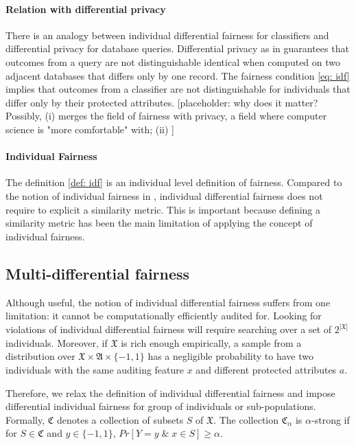 \documentclass{article}
\begin{document}
\paragraph{Relation with differential privacy}
There is an analogy between individual differential fairness for classifiers and differential privacy for database queries. Differential privacy as in  \cite{dwork2014algorithmic} guarantees that outcomes from a query are not distinguishable identical when computed on two adjacent databases that differs only by one record. The fairness condition \eqref{eq: idf} implies that outcomes from a classifier are not distinguishable for individuals that differ only by their protected attributes. [placeholder: why does it matter? Possibly, (i) merges the field of fairness with privacy, a field where computer science is "more comfortable" with; (ii) ] 

\paragraph{Individual Fairness}
The definition \ref{def: idf} is an individual level definition of fairness. Compared to the notion of individual fairness in \cite{dwork2012fairness}, individual differential fairness does not require to explicit a similarity metric. This is important because defining a similarity metric has been the main limitation of applying the concept of individual fairness.

\subsection{Multi-differential fairness}
Although useful, the notion of individual differential fairness suffers from one limitation: it cannot be computationally efficiently audited for. Looking for violations of individual differential fairness will require searching over a set of $2^{|\mathfrak{X}|}$ individuals. Moreover, if $\mathfrak{X}$ is rich enough empirically, a sample from a distribution over $\mathfrak{X} \times \mathfrak{A}\times \{-1, 1\}$ has a negligible probability to have two individuals with the same auditing feature $x$ and different protected attributes $a$. 

\bigskip
Therefore, we relax the definition of individual differential fairness and impose differential individual fairness for group of individuals or sub-populations. Formally, $\mathfrak{C}$ denotes a collection of subsets $S$ of $\mathfrak{X}$. The collection $\mathfrak{C}_{\alpha}$ is $\alpha$-strong if for $S\in \mathfrak{C}$ and $y\in \{-1, 1\}$, $Pr[Y=y \;\&\; x\in S] \geq \alpha$.  
\end{document}
